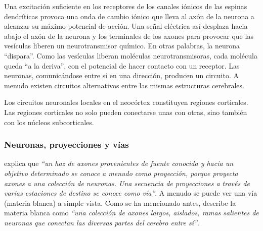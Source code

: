 Una excitación suficiente en los receptores de los canales iónicos de las espinas dendríticas provoca una onda de cambio iónico que lleva al axón de la neurona a alcanzar su máximo potencial de acción. Una señal eléctrica así desplaza hacia abajo el axón de la neurona y los terminales de los axones para provocar que las vesículas liberen un neurotransmisor químico. En otras palabras, la neurona ``dispara''. Como las vesículas liberan moléculas neurotransmisoras, cada molécula queda ``a la deriva'', con el potencial de hacer contacto con un receptor. Las neuronas, comunicándose entre sí en una dirección, producen un circuito. A menudo existen circuitos alternativos entre las mismas estructuras cerebrales.

Los circuitos neuronales locales en el neocórtex constituyen regiones corticales. Las regiones corticales no solo pueden conectarse unas con otras, sino también con los núcleos subcorticales.

\subsubsection{Neuronas, proyecciones y vías}

\cite{Damasio1994} explica que {\it ``un haz de axones provenientes de fuente conocida y hacia un objetivo determinado se conoce a menudo como proyección, porque proyecta axones a una colección de neuronas. Una secuencia de proyecciones a través de varias estaciones de destino se conoce como vía''}. A menudo se puede ver una vía (materia blanca) a simple vista. Como se ha mencionado antes, \cite{Czerner2001} describe la materia blanca como {\it ``una colección de axones largos, aislados, ramas salientes de neuronas que conectan las diversas partes del cerebro entre sí''}.




